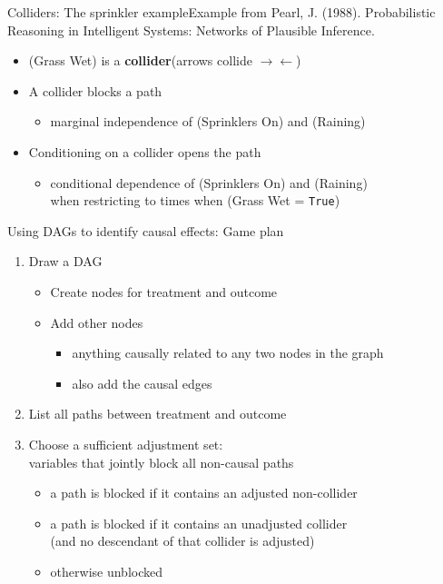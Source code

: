 \documentclass{beamer}
\begin{document}
\begin{frame}{Colliders: The sprinkler example}{Example from Pearl, J. (1988). Probabilistic Reasoning in Intelligent Systems: Networks of Plausible Inference.}
\begin{center}
\end{center} \pause
\begin{itemize}
\item (Grass Wet) is a \textbf{collider}\hfill (arrows collide $\rightarrow\leftarrow$) \pause
\item A collider blocks a path
\begin{itemize}
\item marginal independence of (Sprinklers On) and (Raining) \pause
\end{itemize}
\item Conditioning on a collider opens the path
\begin{itemize}
\item conditional dependence of (Sprinklers On) and (Raining)\\when restricting to times when (Grass Wet = \texttt{True})
\end{itemize}
\end{itemize}
\end{frame}

\begin{frame}{Using DAGs to identify causal effects: Game plan} \pause

\begin{enumerate}[<+->]
\item Draw a DAG
\begin{itemize}
\item Create nodes for treatment and outcome
\item Add other nodes
\begin{itemize}
\item anything causally related to any two nodes in the graph
\item also add the causal edges
\end{itemize}
\end{itemize}
\item List all paths between treatment and outcome
\item Choose a sufficient adjustment set:\\variables that jointly block all non-causal paths
\begin{itemize}
\item a path is blocked if it contains an adjusted non-collider
\item a path is blocked if it contains an unadjusted collider\\(and no descendant of that collider is adjusted)
\item otherwise unblocked
\end{itemize}
\end{enumerate}

\end{frame}
\end{document}
